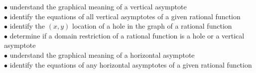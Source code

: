 \documentclass{ximera}
\begin{document}
\noindent$\bullet$ understand the graphical meaning of a vertical asymptote
\\$\bullet$ identify the equations of all vertical asymptotes of a given rational function
\\$\bullet$ identify the $(x,y)$ location of a hole in the graph of a rational function
\\$\bullet$ determine if a domain restriction of a rational function is a hole or a vertical asymptote
\\$\bullet$ understand the graphical meaning of a horizontal asymptote
\\$\bullet$ identify the equations of any horizontal asymptotes of a given rational function
\end{document}
